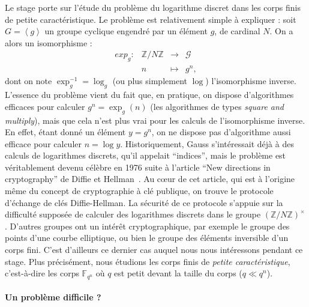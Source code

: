 \documentclass[a4paper,11pt]{article}
\theoremstyle{break}
\theoremstyle{sc}
\theoremstyle{definition}
\theoremstyle{remark}
\begin{document}
Le stage porte sur l'étude du problème du logarithme discret dans les corps
finis de petite caractéristique. Le problème est relativement simple à
expliquer : soit $G=\left\langle g\right\rangle$ un groupe cyclique engendré par
un élément $g$, de cardinal $N$. On a alors un isomorphisme :
\[
   \begin{array}{cccc}
        exp_g: & \mathbb{Z}/N\mathbb{Z} & \to & \mathcal G \\
        & n & \mapsto & g^n,
   \end{array}
\]
dont on note $\exp_g^{-1}=\log_g$ (ou plus simplement $\log$) l'isomorphisme
inverse. L'essence du problème vient du fait que, en pratique, on dispose
d'algorithmes efficaces pour calculer $g^n=\exp_g(n)$ (les algorithmes de types
\emph{square and multiply}), mais que cela n'est plus vrai pour les calculs de
l'isomorphisme inverse. En effet, étant donné un élément $y=g^n$, on ne dispose
pas d'algorithme aussi efficace pour calculer $n = \log y$.
Historiquement, Gauss s'intéressait déjà à des
calculs de logarithmes discrets, qu'il appelait ``indices'', mais le problème
est véritablement devenu célèbre en 1976 suite à l'article ``New directions in
cryptography'' de Diffie et Hellman~\cite{DH76}. Au cœur de cet article, qui 
est à l'origine même du concept de cryptographie à clé publique, on trouve le 
protocole d'échange de clés Diffie-Hellman. La sécurité de ce protocole 
s'appuie sur la difficulté supposée de calculer des logarithmes discrets dans le
groupe $(\mathbb{Z}/N\mathbb{Z})^\times$. D'autres groupes ont un intérêt
cryptographique, par exemple le groupe des points d'une courbe
elliptique, ou bien le groupe des éléments inversible d'un corps fini.
C'est d'ailleurs ce dernier cas auquel nous nous intéressons pendant ce stage.
Plus précisément, nous étudions les corps finis de \emph{petite
caractéristique}, c'est-à-dire les corps $\mathbb{F}_{q^n}$ où $q$ est petit
devant la taille du corps ($q\ll q^n$).

\paragraph{Un problème difficile ?}
\end{document}

